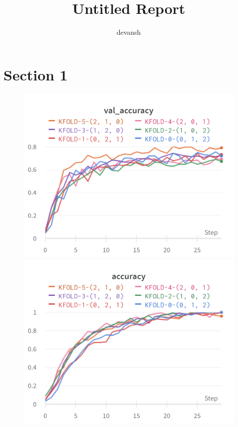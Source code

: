 \documentclass{article}
\title{Untitled Report}
\author{%
devansh
}
\begin{document}
\maketitle

\section{Section 1}

\begin{figure}[!htb]
\includegraphics[width=\linewidth]{charts/Section-2-Panel-0-rz525hprp}
\caption{}
\endminipage\hfill
{}
\includegraphics[width=\linewidth]{charts/Section-2-Panel-1-uerk10qjs}
\caption{}
\endminipage
\end{figure}
\end{document}
